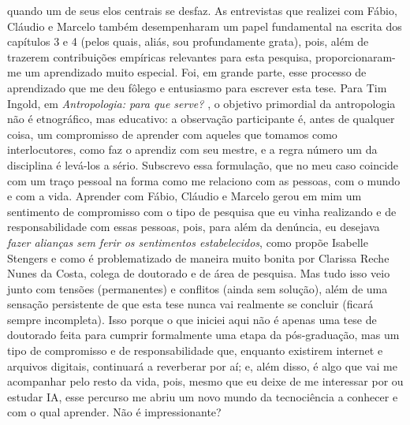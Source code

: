 quando um de seus elos centrais se desfaz. As entrevistas que realizei com Fábio, Cláudio e Marcelo também desempenharam um papel fundamental na escrita dos capítulos 3 e 4 (pelos quais, aliás, sou profundamente grata), pois, além de trazerem contribuições empíricas relevantes para esta pesquisa, proporcionaram-me um aprendizado muito especial. Foi, em grande parte, esse processo de aprendizado que me deu fôlego e entusiasmo para escrever esta tese. Para Tim Ingold, em \textit{Antropologia: para que serve?} \parencite[pp.~16--17]{Ingold2019Antropologia}, o objetivo primordial da antropologia não é etnográfico, mas educativo: a observação participante é, antes de qualquer coisa, um compromisso de aprender com aqueles que tomamos como interlocutores, como faz o aprendiz com seu mestre, e a regra número um da disciplina é levá-los a sério. Subscrevo essa formulação, que no meu caso coincide com um traço pessoal na forma como me relaciono com as pessoas, com o mundo e com a vida. Aprender com Fábio, Cláudio e Marcelo gerou em mim um sentimento de compromisso com o tipo de pesquisa que eu vinha realizando e de responsabilidade com essas pessoas, pois, para além da denúncia, eu desejava \textit{fazer alianças sem ferir os sentimentos estabelecidos}, como propõe Isabelle Stengers e como é problematizado de maneira muito bonita por Clarissa Reche Nunes da Costa, colega de doutorado e de área de pesquisa. Mas tudo isso veio junto com tensões (permanentes) e conflitos (ainda sem solução), além de uma sensação persistente de que esta tese nunca vai realmente se concluir (ficará sempre incompleta). Isso porque o que iniciei aqui não é apenas uma tese de doutorado feita para cumprir formalmente uma etapa da pós-graduação, mas um tipo de compromisso e de responsabilidade que, enquanto existirem internet e arquivos digitais, continuará a reverberar por aí; e, além disso, é algo que vai me acompanhar pelo resto da vida, pois, mesmo que eu deixe de me interessar por ou estudar IA, esse percurso me abriu um novo mundo da tecnociência a conhecer e com o qual aprender. Não é impressionante? 

